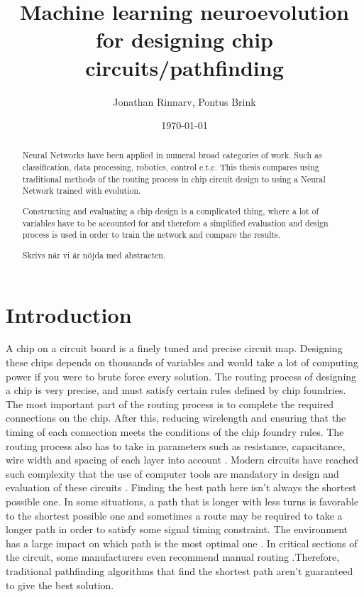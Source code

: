 \documentclass{kththesis}
\title{Machine learning neuroevolution for designing chip circuits/pathfinding}
\author{Jonathan Rinnarv, Pontus Brink}
\date{\today}
\begin{document}
\frontmatter

\titlepage

\begin{abstract}
Neural Networks have been applied in numeral broad categories of work. Such as classification, data processing, robotics, control e.t.c. This thesis compares using traditional methods of the routing process in chip circuit design to using a Neural Network trained with evolution.

Constructing and evaluating a chip design is a complicated thing, where a lot of variables have to be accounted for and therefore a simplified evaluation and design process is used in order to train the network and compare the results. 
\end{abstract}


\begin{otherlanguage}{swedish}
  \begin{abstract}
   Skrivs när vi är nöjda med abstracten.
  \end{abstract}
\end{otherlanguage}


\tableofcontents


\mainmatter


\chapter{Introduction}

A chip on a circuit board is a finely tuned and precise circuit map. Designing these chips depends on thousands of variables and would take a lot of computing power if you were to brute force every solution. The routing process of designing a chip is very precise, and must satisfy certain rules defined by chip foundries. The most important part of the routing process is to complete the required connections on the chip. After this, reducing wirelength and ensuring that the timing of each connection meets the conditions of the chip foundry rules. The routing process also has to take in parameters such as resistance, capacitance, wire width and spacing of each layer into account \parencite{EDA_routing}. Modern circuits have reached such complexity that the use of computer tools are mandatory in design and evaluation of these circuits \parencite{Digital_Integrated_Circuits}. Finding the best path here isn’t always the shortest possible one. In some situations, a path that is longer with less turns is favorable to the shortest possible one and sometimes a route may be required to take a longer path in order to satisfy some signal timing constraint. The environment has a large impact on which path is the most optimal one \parencite{PCBROUTERS}. In critical sections of the circuit, some manufacturers even recommend manual routing \parencite{NI}.Therefore, traditional pathfinding algorithms that find the shortest path aren’t guaranteed to give the best solution.
\end{document}
